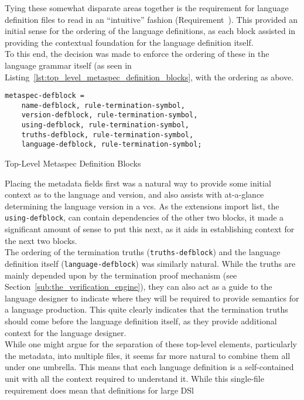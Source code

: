 Tying these somewhat disparate areas together is the requirement for language definition files to read in an ``intuitive'' fashion (Requirement~). 
This provided an initial sense for the ordering of the language definitions, as each block assisted in providing the contextual foundation for the language definition itself. \\

To this end, the decision was made to enforce the ordering of these in the language grammar itself (as seen in Listing~\ref{lst:top_level_metaspec_definition_blocks}, with the ordering as above.

\begin{listing}[!htb]
\begin{verbatim}
metaspec-defblock = 
    name-defblock, rule-termination-symbol, 
    version-defblock, rule-termination-symbol, 
    using-defblock, rule-termination-symbol, 
    truths-defblock, rule-termination-symbol, 
    language-defblock, rule-termination-symbol;
\end{verbatim}
\caption{Top-Level Metaspec Definition Blocks}
\label{lst:top_level_metaspec_definition_blocks}
\end{listing}

Placing the metadata fields first was a natural way to provide some initial context as to the language and version, and also assists with at-a-glance determining the language version in a \gls{vcs}.
As the extensions import list, the \texttt{using-defblock}, can contain dependencies of the other two blocks, it made a significant amount of sense to put this next, as it aids in establishing context for the next two blocks.\\

The ordering of the termination truths (\texttt{truths-defblock}) and the language definition itself (\texttt{language-defblock}) was similarly natural. 
While the truths are mainly depended upon by the termination proof mechanism (see Section~\ref{sub:the_verification_engine}), they can also act as a guide to the language designer to indicate where they will be required to provide semantics for a language production. 
This quite clearly indicates that the termination truths should come before the language definition itself, as they provide additional context for the language designer.\\

While one might argue for the separation of these top-level elements, particularly the metadata, into multiple files, it seems far more natural to combine them all under one umbrella.
This means that each language definition is a self-contained unit with all the context required to understand it. 
While this single-file requirement does mean that definitions for large DSl

